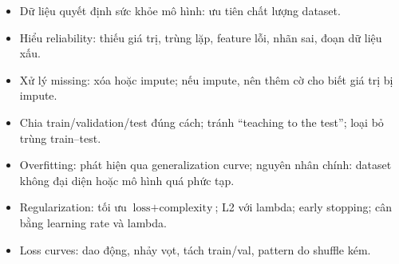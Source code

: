 \documentclass[12pt,a4paper]{article}
\begin{document}
\begin{tongket}[title={Tổng kết chương}]
\begin{itemize}
  \item Dữ liệu quyết định sức khỏe mô hình: ưu tiên chất lượng dataset.
  \item Hiểu reliability: thiếu giá trị, trùng lặp, feature lỗi, nhãn sai, đoạn dữ liệu xấu.
  \item Xử lý missing: xóa hoặc impute; nếu impute, nên thêm cờ cho biết giá trị bị impute.
  \item Chia train/validation/test đúng cách; tránh ``teaching to the test''; loại bỏ trùng train--test.
  \item Overfitting: phát hiện qua generalization curve; nguyên nhân chính: dataset không đại diện hoặc mô hình quá phức tạp.
  \item Regularization: tối ưu \(\text{loss}+\text{complexity}\); L2 với lambda; early stopping; cân bằng learning rate và lambda.
  \item Loss curves: dao động, nhảy vọt, tách train/val, pattern do shuffle kém.
\end{itemize}
\end{tongket}
\end{document}
